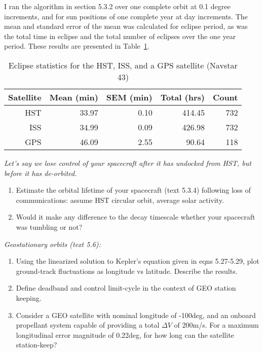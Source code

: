 \documentclass[onecolumn,10pt]{jhwhw}
\begin{document}
I ran the algorithm in section 5.3.2 over one complete orbit at 0.1 degree increments, and for sun positions of one complete year at day increments. The mean and standard error of the mean was calculated for eclipse period, as was the total time in eclipse and the total number of eclipses over the one year period. These results are presented in Table~\ref{p2table}.

\begin{table}[h]
\begin{center}
\begin{tabular}{rrrrr}
\toprule
Satellite & Mean (min) & SEM (min) & Total (hrs) & Count \\
\midrule
HST & 33.97 & 0.10 & 414.45 & 732 \\
ISS & 34.99 & 0.09 & 426.98 & 732 \\
GPS & 46.09 & 2.55 &  90.64 & 118 \\
\bottomrule
\end{tabular}
\end{center}
\caption{Eclipse statistics for the HST, ISS, and a GPS satellite (Navstar 43)}
\label{p2table}
\end{table}



\clearpage

\problem{}
\textit{Let’s say we lose control of your spacecraft after it has undocked from HST, but before it has de-orbited.}
\begin{enumerate}
\itemsep0em
\item Estimate the orbital lifetime of your spacecraft (text 5.3.4) following loss of communications: assume HST
circular orbit, average solar activity.
\item Would it make any difference to the decay timescale whether your spacecraft was tumbling or not?
\end{enumerate}
\clearpage

\problem{}
\textit{Geostationary orbits (text 5.6):}
\begin{enumerate}
\itemsep0em
\item Using the linearized solution to Kepler’s equation given in eqns 5.27-5.29, plot ground-track fluctuations as longitude vs latitude. Describe the results.
\item Define deadband and control limit-cycle in the context of GEO station keeping.
\item Consider a GEO satellite with nominal longitude of -100deg, and an onboard propellant system capable of
providing a total $\Delta V$ of 200m/s. For a maximum longitudinal error magnitude of 0.22deg, for how long can the satellite station-keep?
\end{enumerate}
\clearpage
\end{document}
